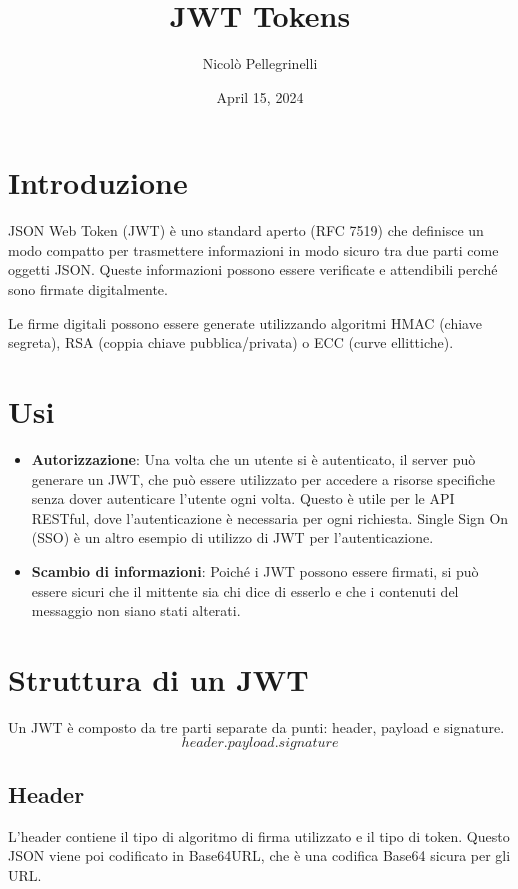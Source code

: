 \documentclass{article}
\title{JWT Tokens}
\author{Nicolò Pellegrinelli}
\date{April 15, 2024}
\begin{document}
\sloppy

\maketitle

\section{Introduzione}
JSON Web Token (JWT) è uno standard aperto (RFC 7519) che definisce un modo compatto per trasmettere informazioni in modo sicuro tra due parti come oggetti JSON.
Queste informazioni possono essere verificate e attendibili perché sono firmate digitalmente.

Le firme digitali possono essere generate utilizzando algoritmi HMAC (chiave segreta), RSA (coppia chiave pubblica/privata) o ECC (curve ellittiche).

\section{Usi}
\begin{itemize}
	\item \textbf{Autorizzazione}: Una volta che un utente si è autenticato, il server può generare un JWT, che può essere utilizzato per accedere a risorse specifiche senza dover autenticare l'utente ogni volta.
	      Questo è utile per le API RESTful, dove l'autenticazione è necessaria per ogni richiesta.
	      Single Sign On (SSO) è un altro esempio di utilizzo di JWT per l'autenticazione.
	\item \textbf{Scambio di informazioni}: Poiché i JWT possono essere firmati, si può essere sicuri che il mittente sia chi dice di esserlo e che i contenuti del messaggio non siano stati alterati.
\end{itemize}

\section{Struttura di un JWT}
Un JWT è composto da tre parti separate da punti: header, payload e signature.
$$header.payload.signature$$

\subsection{Header}
L'header contiene il tipo di algoritmo di firma utilizzato e il tipo di token.
Questo JSON viene poi codificato in Base64URL, che è una codifica Base64 sicura per gli URL.
\end{document}

